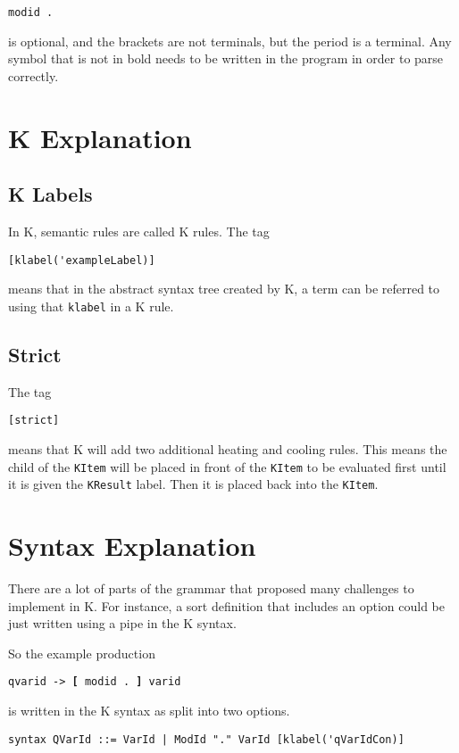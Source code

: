 \begin{lstlisting}
modid .
\end{lstlisting}

is optional, and the brackets are not terminals, but the period is a terminal. Any symbol that is not in bold needs to be written in the program in order to parse correctly.

\section{K Explanation}
\subsection{K Labels}
In K, semantic rules are called K rules. The tag

\begin{lstlisting}
[klabel('exampleLabel)]
\end{lstlisting}

means that in the abstract syntax tree created by K, a term can be referred to using that \texttt{klabel} in a K rule.

\subsection{Strict}
The tag

\begin{lstlisting}
[strict]
\end{lstlisting}

means that K will add two additional heating and cooling rules. This means the child of the \texttt{KItem} will be placed in front of the \texttt{KItem} to be evaluated first until it is given the \texttt{KResult} label. Then it is placed back into the \texttt{KItem}.

\section{Syntax Explanation}
There are a lot of parts of the grammar that proposed many challenges to implement in K. For instance, a sort definition that includes an option could be just written using a pipe
in the K syntax.

So the example production

\texttt{qvarid -> \textbf{[} modid . \textbf{]} varid}

is written in the K syntax as split into two options.

\begin{lstlisting}
syntax QVarId ::= VarId | ModId "." VarId [klabel('qVarIdCon)]
\end{lstlisting}

